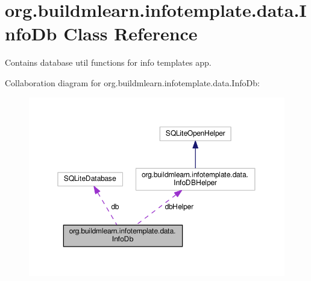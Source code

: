 \hypertarget{classorg_1_1buildmlearn_1_1infotemplate_1_1data_1_1InfoDb}{}\section{org.\+buildmlearn.\+infotemplate.\+data.\+Info\+Db Class Reference}
\label{classorg_1_1buildmlearn_1_1infotemplate_1_1data_1_1InfoDb}


Contains database util functions for info template\textquotesingle{}s app.  




Collaboration diagram for org.\+buildmlearn.\+infotemplate.\+data.\+Info\+Db\+:
\nopagebreak
\begin{figure}[H]
\begin{center}
\leavevmode
\includegraphics[width=350pt]{classorg_1_1buildmlearn_1_1infotemplate_1_1data_1_1InfoDb__coll__graph}
\end{center}
\end{figure}
